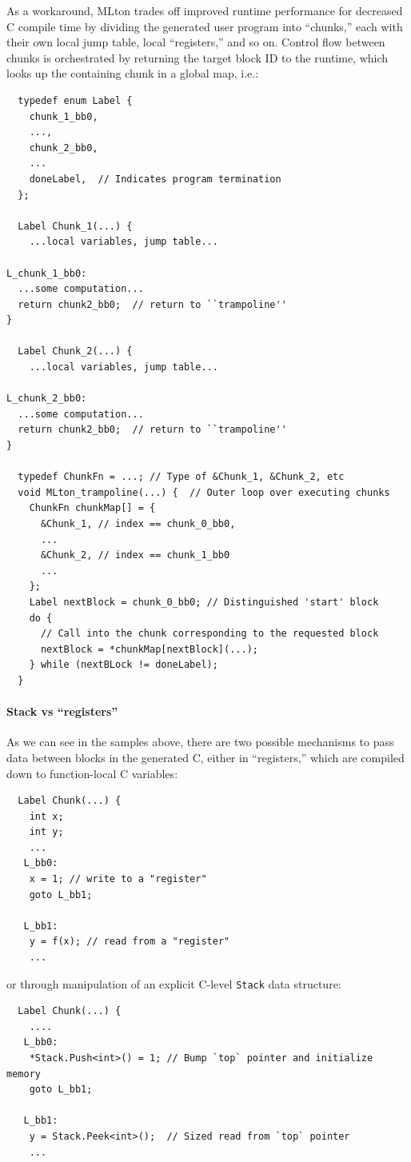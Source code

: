 \documentclass[leqno,11pt]{article}
\begin{document}
As a workaround, MLton trades off improved runtime performance for decreased C
compile time by dividing the generated user program into ``chunks,'' each with
their own local jump table, local ``registers,'' and so on. Control flow between
chunks is orchestrated by returning the target block ID to the runtime, which
looks up the containing chunk in a global map, i.e.:
\begin{verbatim}
  typedef enum Label {
    chunk_1_bb0,
    ...,
    chunk_2_bb0,
    ...
    doneLabel,  // Indicates program termination
  };

  Label Chunk_1(...) {
    ...local variables, jump table...

L_chunk_1_bb0:
  ...some computation...
  return chunk2_bb0;  // return to ``trampoline''
}

  Label Chunk_2(...) {
    ...local variables, jump table...

L_chunk_2_bb0:
  ...some computation...
  return chunk2_bb0;  // return to ``trampoline''
}

  typedef ChunkFn = ...; // Type of &Chunk_1, &Chunk_2, etc
  void MLton_trampoline(...) {  // Outer loop over executing chunks
    ChunkFn chunkMap[] = {
      &Chunk_1, // index == chunk_0_bb0,
      ...
      &Chunk_2, // index == chunk_1_bb0
      ...
    };
    Label nextBlock = chunk_0_bb0; // Distinguished 'start' block
    do {
      // Call into the chunk corresponding to the requested block
      nextBlock = *chunkMap[nextBlock](...);
    } while (nextBLock != doneLabel);
  }
\end{verbatim}


\paragraph{Stack vs ``registers''}
As we can see in the samples above, there are two possible mechanisms to pass
data between blocks in the generated C, either in ``registers,'' which are
compiled down to function-local C variables:
\begin{verbatim}
  Label Chunk(...) {
    int x;
    int y;
    ...
   L_bb0:
    x = 1; // write to a "register"
    goto L_bb1;

   L_bb1:
    y = f(x); // read from a "register"
    ...
\end{verbatim}
or through manipulation of an explicit C-level \texttt{Stack} data structure:
\begin{verbatim}
  Label Chunk(...) {
    ....
   L_bb0:
    *Stack.Push<int>() = 1; // Bump `top` pointer and initialize memory
    goto L_bb1;

   L_bb1:
    y = Stack.Peek<int>();  // Sized read from `top` pointer
    ...
\end{verbatim}
\end{document}
